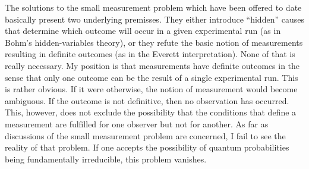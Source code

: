 \documentclass[12pt]{article}
\begin{document}
The solutions to the small measurement problem which have been offered to date basically present two underlying premisses. They either introduce ``hidden'' causes that determine which outcome will occur in a given experimental run (as in Bohm's hidden-variables theory), or they refute the basic notion of measurements resulting in definite outcomes (as in the Everett interpretation). None of that is really necessary. My position is that measurements have definite outcomes in the sense that only one outcome can be the result of a single experimental run. This is rather obvious. If it were otherwise, the notion of measurement would become ambiguous. If the outcome is not definitive, then no observation has occurred. This, however, does not exclude the possibility that the conditions that define a measurement are fulfilled for one observer but not for another. As far as discussions of the small measurement problem are concerned, I fail to see the reality of that problem. If one accepts the possibility of quantum probabilities being fundamentally irreducible, this problem vanishes. 
\end{document}
